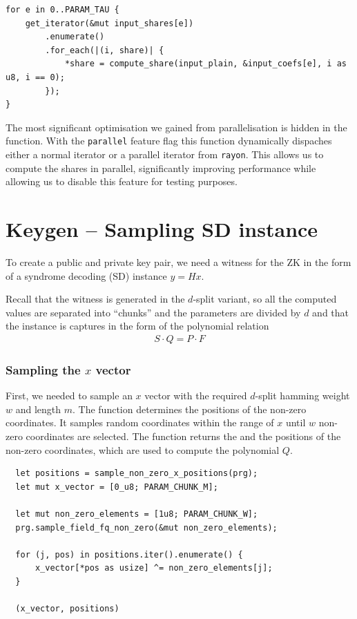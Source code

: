 \documentclass[11pt]{report}
\theoremstyle{definition}
\theoremstyle{plain}
\begin{document}
\begin{verbatim}
for e in 0..PARAM_TAU {
    get_iterator(&mut input_shares[e])
        .enumerate()
        .for_each(|(i, share)| {
            *share = compute_share(input_plain, &input_coefs[e], i as u8, i == 0);
        });
}
\end{verbatim}

The most significant optimisation we gained from parallelisation is hidden in the  function. With the \texttt{parallel} feature flag this function dynamically dispaches either a normal iterator or a parallel iterator from \texttt{rayon}. This allows us to compute the shares in parallel, significantly improving performance while allowing us to disable this feature for testing purposes.

\section{Keygen -- Sampling SD instance}\label{sub:witness_generation}

To create a public and private key pair, we need a witness for the ZK in the form of a syndrome decoding (SD) instance $y = Hx$.

Recall that the witness is generated in the $d$-split variant, so all the computed values are separated into ``chunks'' and the parameters are divided by $d$ and that the instance is captures in the form of the polynomial relation
\begin{align*}
  S\cdot Q = P\cdot F
\end{align*}

\subsubsection{Sampling the $x$ vector}

First, we needed to sample an $x$ vector with the required $d$-split hamming weight $w$ and length $m$. The function  determines the positions of the non-zero coordinates. It samples random coordinates within the range of $x$ until $w$ non-zero coordinates are selected. The function returns the  and the positions of the non-zero coordinates, which are used to compute the polynomial $Q$.

\begin{verbatim}
  let positions = sample_non_zero_x_positions(prg);
  let mut x_vector = [0_u8; PARAM_CHUNK_M];
  
  let mut non_zero_elements = [1u8; PARAM_CHUNK_W];
  prg.sample_field_fq_non_zero(&mut non_zero_elements);

  for (j, pos) in positions.iter().enumerate() {
      x_vector[*pos as usize] ^= non_zero_elements[j];
  }

  (x_vector, positions)
\end{verbatim}
\end{document}
